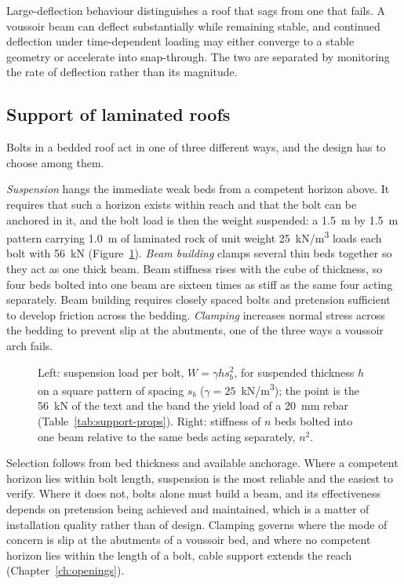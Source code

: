 Large-deflection behaviour distinguishes a roof that sags from one that fails.
A voussoir beam can deflect substantially while remaining stable, and
continued deflection under time-dependent loading may either converge to a
stable geometry or accelerate into snap-through. The two are separated by
monitoring the rate of deflection rather than its magnitude.

\subsection{Support of laminated roofs}
\label{sec:laminated-roof-support}

Bolts in a bedded roof act in one of three different ways, and the
design has to choose among them.

\emph{Suspension} hangs the immediate weak beds from a competent horizon
above. It requires that such a horizon exists within reach and that the bolt
can be anchored in it, and the bolt load is then the weight suspended:
a 1.5~m by 1.5~m pattern carrying 1.0~m of laminated rock of unit weight
25~kN/m\textsuperscript{3} loads each bolt with 56~kN
(Figure~\ref{fig:roof-bolt-load}).
\emph{Beam building} clamps several thin beds together so they act as one
thick beam. Beam stiffness rises with the cube of
thickness, so four beds bolted into one beam are sixteen times as stiff
as the same four acting separately. Beam building requires closely spaced bolts and pretension sufficient to develop friction across the
bedding. \emph{Clamping} increases normal stress
across the bedding to prevent slip at the abutments, one of the three ways a
voussoir arch fails.

\begin{figure}[htbp]
\centering
{}
\caption{Left: suspension load per bolt, $W = \gamma h s_b^2$, for suspended thickness $h$ on a square pattern of spacing $s_b$ ($\gamma = 25$~kN/m\textsuperscript{3}); the point is the 56~kN of the text and the band the yield load of a 20~mm rebar (Table~\ref{tab:support-props}). Right: stiffness of $n$ beds bolted into one beam relative to the same beds acting separately, $n^2$.}
\label{fig:roof-bolt-load}
\end{figure}

Selection follows from bed thickness and available anchorage. Where a
competent horizon lies within bolt length, suspension is the most reliable and
the easiest to verify. Where it does not, bolts alone must build a beam,
and its effectiveness depends on pretension being achieved and
maintained, which is a matter of installation quality rather than of design.
Clamping governs where the mode of concern is slip at the abutments of a
voussoir bed, and where no competent horizon lies within the length of a
bolt, cable support extends the reach (Chapter~\ref{ch:openings}).


